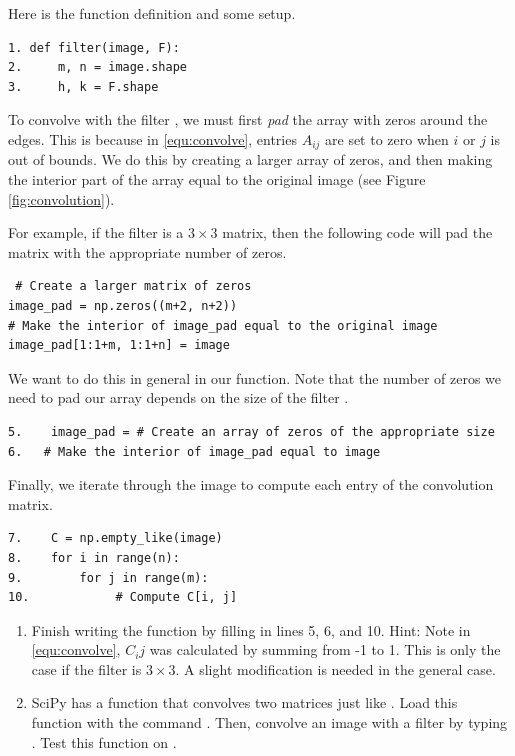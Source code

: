 Here is the function definition and some setup.
\begin{lstlisting}
1. def filter(image, F):
2.     m, n = image.shape
3.     h, k = F.shape
\end{lstlisting}
To convolve  with the filter , we must first \emph{pad} the array  with zeros around the edges.
This is because in \eqref{equ:convolve}, entries $A_{ij}$ are set to zero when $i$ or $j$ is out of bounds.
We do this by creating a larger array of zeros, and then making the interior part of the array equal to the original image (see Figure \ref{fig:convolution}).

For example, if the filter is a $3 \times 3$ matrix, then the following code will pad the matrix with the appropriate number of zeros.
\begin{lstlisting}
 # Create a larger matrix of zeros
image_pad = np.zeros((m+2, n+2))
# Make the interior of image_pad equal to the original image
image_pad[1:1+m, 1:1+n] = image
\end{lstlisting}
We want to do this in general in our function.  Note that the number of zeros we need to pad our array depends on the size of the filter .
\begin{lstlisting}
5.    image_pad = # Create an array of zeros of the appropriate size
6.   # Make the interior of image_pad equal to image
\end{lstlisting}

Finally, we iterate through the image to compute each entry of the convolution matrix.
\begin{lstlisting}
7.    C = np.empty_like(image)
8.    for i in range(n):
9.        for j in range(m):
10.            # Compute C[i, j]
\end{lstlisting}


\begin{problem}\label{prob:filter}
\leavevmode
\begin{enumerate}
\item Finish writing the function  by filling in lines 5, 6, and 10.  Hint: Note in \ref{equ:convolve}, $C_ij$ was calculated by summing from -1 to 1.  This is only the case if the filter  is $3 \times 3$. A slight modification is needed in the general case.
\item SciPy has a function that convolves two matrices just like .
Load this function with the command . 
Then, convolve an image  with a filter  by typing .
Test this function on .
\end{enumerate}
\end{problem}

